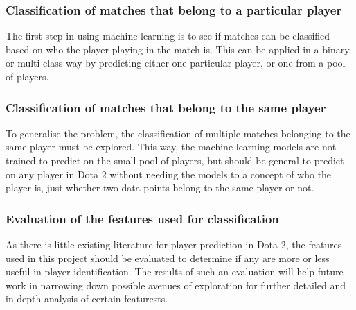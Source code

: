 \documentclass[Report.tex]{subfiles}
\begin{document}
\subsubsection{Classification of matches that belong to a particular player}
The first step in using machine learning is to see if matches can be classified based on who the player playing in the match is. This can be applied in a binary or multi-class way by predicting either one particular player, or one from a pool of players. 

\subsubsection{Classification of matches that belong to the same player}
To generalise the problem, the classification of multiple matches belonging to the same player must be explored. This way, the machine learning models are not trained to predict on the small pool of players, but should be general to predict on any player in Dota 2 without needing the models to a concept of who the player is, just whether two data points belong to the same player or not. 

\subsubsection{Evaluation of the features used for classification}
As there is little existing literature for player prediction in Dota 2, the features used in this project should be evaluated to determine if any are more or less useful in player identification. The results of such an evaluation will help future work in narrowing down possible avenues of exploration for further detailed and in-depth analysis of certain featurests. 





\end{document}
